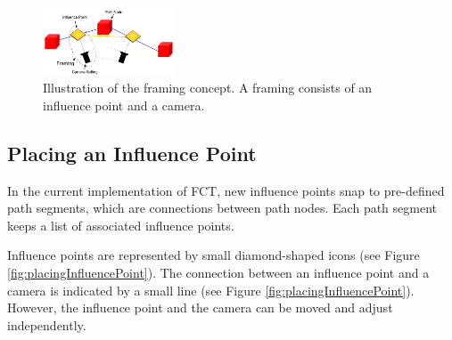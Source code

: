 \begin{figure}[htbp]
\centering
\includegraphics[width=0.35\textwidth]{Pics/Instructions}
\caption{Illustration of the framing concept. A framing consists of an influence point and a camera.}
\label{fig:framingConceptNew}
\end{figure}



\subsection{Placing an Influence Point}
In the current implementation of FCT, new influence points snap to pre-defined path segments, which are connections between path nodes. Each path segment keeps a list of associated influence points.

Influence points are represented by small diamond-shaped icons (see Figure \ref{fig:placingInfluencePoint}). The connection between an influence point and a camera is indicated by a small line (see Figure \ref{fig:placingInfluencePoint}). However, the influence point and the camera can be moved and adjust independently.


